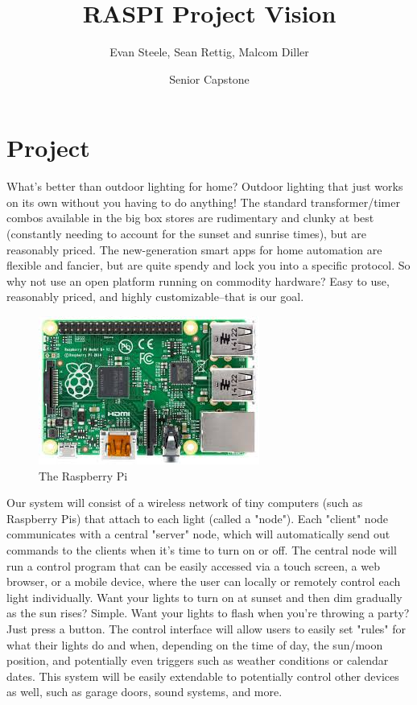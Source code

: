 \documentclass{article}
\title{RASPI Project Vision}
\author{Evan Steele, Sean Rettig, Malcom Diller }
\date{Senior Capstone}
\begin{document}
\maketitle

\section{Project}
What's better than outdoor lighting for home?  Outdoor lighting that just works on its own without you having to do anything!  The standard transformer/timer combos available in the big box stores are rudimentary and clunky at best (constantly needing to account for the sunset and sunrise times), but are reasonably priced. The new-generation smart apps for home automation are flexible and fancier, but are quite spendy and lock you into a specific protocol.  So why not use an open platform running on commodity hardware?  Easy to use, reasonably priced, and highly customizable--that is our goal.

\begin{figure}[h!]
\centering
\includegraphics[scale=0.5]{raspi.jpg}
\caption{The Raspberry Pi}
\label{fig:raspberry pi}
\end{figure}

Our system will consist of a wireless network of tiny computers (such as Raspberry Pis) that attach to each light (called a "node").  Each "client" node communicates with a central "server" node, which will automatically send out commands to the clients when it's time to turn on or off.  The central node will run a control program that can be easily accessed via a touch screen, a web browser, or a mobile device, where the user can locally or remotely control each light individually.  Want your lights to turn on at sunset and then dim gradually as the sun rises?  Simple.  Want your lights to flash when you're throwing a party?  Just press a button.  The control interface will allow users to easily set "rules" for what their lights do and when, depending on the time of day, the sun/moon position, and potentially even triggers such as weather conditions or calendar dates.  This system will be easily extendable to potentially control other devices as well, such as garage doors, sound systems, and more.
\end{document}
